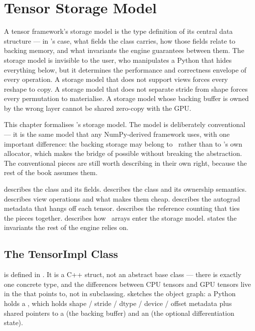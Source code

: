 \chapter{Tensor Storage Model}
\label{ch:tensor_model}

A tensor framework's storage model is the type definition of its
central data structure --- in \Lucid's case, what fields the
 class carries, how those fields relate to backing
memory, and what invariants the engine guarantees between them. The
storage model is invisible to the user, who manipulates a Python
 that hides everything below, but it determines the
performance and correctness envelope of every operation. A storage
model that does not support views forces every reshape to copy. A
storage model that does not separate stride from shape forces every
permutation to materialise. A storage model whose backing buffer is
owned by the wrong layer cannot be shared zero-copy with the GPU.

This chapter formalises \Lucid's storage model. The model is
deliberately conventional --- it is the same model that any
NumPy-derived framework uses, with one important difference: the
backing storage may belong to \MLX\ rather than to \Lucid's own
allocator, which makes the bridge of 
possible without breaking the abstraction. The conventional pieces
are still worth describing in their own right, because the rest of
the book assumes them.

 describes the 
class and its fields.  describes
the  class and its ownership semantics.
 describes view operations and what
makes them cheap.  describes
the autograd metadata that hangs off each tensor.
 describes the reference
counting that ties the pieces together.
 describes how \MLX\ arrays enter
the storage model.  states the
invariants the rest of the engine relies on.

\section{The TensorImpl Class}
\label{sec:tensor_model:tensorimpl}

 is defined in
. It is a C++ struct, not an
abstract base class --- there is exactly one concrete
 type, and the differences between CPU tensors and
GPU tensors live in the  that 
points to, not in subclassing.
 sketches the object graph: a
Python  holds a , which holds shape /
stride / dtype / device / offset metadata plus shared pointers to a
 (the backing buffer) and an  (the
optional differentiation state).

